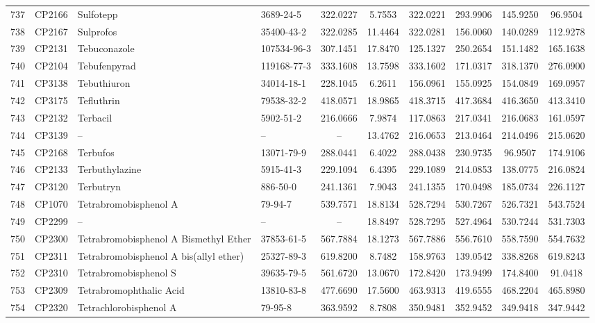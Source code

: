 \begin{longtable}{clllcccccc}
737 & CP2166 & Sulfotepp & 3689-24-5 & 322.0227 & 5.7553 & 322.0221 & 293.9906 & 145.9250 & 96.9504 \\ 
738 & CP2167 & Sulprofos & 35400-43-2 & 322.0285 & 11.4464 & 322.0281 & 156.0060 & 140.0289 & 112.9278 \\ 
739 & CP2131 & Tebuconazole & 107534-96-3 & 307.1451 & 17.8470 & 125.1327 & 250.2654 & 151.1482 & 165.1638 \\ 
740 & CP2104 & Tebufenpyrad & 119168-77-3 & 333.1608 & 13.7598 & 333.1602 & 171.0317 & 318.1370 & 276.0900 \\ 
741 & CP3138 & Tebuthiuron & 34014-18-1 & 228.1045 & 6.2611 & 156.0961 & 155.0925 & 154.0849 & 169.0957 \\ 
742 & CP3175 & Tefluthrin & 79538-32-2 & 418.0571 & 18.9865 & 418.3715 & 417.3684 & 416.3650 & 413.3410 \\ 
743 & CP2132 & Terbacil & 5902-51-2 & 216.0666 & 7.9874 & 117.0863 & 217.0341 & 216.0683 & 161.0597 \\ 
744 & CP3139 & – & – & – & 13.4762 & 216.0653 & 213.0464 & 214.0496 & 215.0620 \\ 
745 & CP2168 & Terbufos & 13071-79-9 & 288.0441 & 6.4022 & 288.0438 & 230.9735 & 96.9507 & 174.9106 \\ 
746 & CP2133 & Terbuthylazine & 5915-41-3 & 229.1094 & 6.4395 & 229.1089 & 214.0853 & 138.0775 & 216.0824 \\ 
747 & CP3120 & Terbutryn & 886-50-0 & 241.1361 & 7.9043 & 241.1355 & 170.0498 & 185.0734 & 226.1127 \\ 
748 & CP1070 & Tetrabromobisphenol A & 79-94-7 & 539.7571 & 18.8134 & 528.7294 & 530.7267 & 526.7321 & 543.7524 \\ 
749 & CP2299 & – & – & – & 18.8497 & 528.7295 & 527.4964 & 530.7244 & 531.7303 \\ 
750 & CP2300 & Tetrabromobisphenol A Bismethyl Ether & 37853-61-5 & 567.7884 & 18.1273 & 567.7886 & 556.7610 & 558.7590 & 554.7632 \\ 
751 & CP2311 & Tetrabromobisphenol A bis(allyl ether) & 25327-89-3 & 619.8200 & 8.7482 & 158.9763 & 139.0542 & 338.8268 & 619.8243 \\ 
752 & CP2310 & Tetrabromobisphenol S & 39635-79-5 & 561.6720 & 13.0670 & 172.8420 & 173.9499 & 174.8400 & 91.0418 \\ 
753 & CP2309 & Tetrabromophthalic Acid & 13810-83-8 & 477.6690 & 17.5600 & 463.9313 & 419.6555 & 468.2204 & 465.8980 \\ 
754 & CP2320 & Tetrachlorobisphenol A & 79-95-8 & 363.9592 & 8.7808 & 350.9481 & 352.9452 & 349.9418 & 347.9442 \\ 

\end{longtable}
